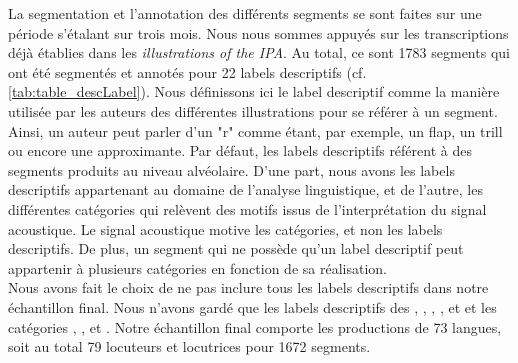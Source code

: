 La segmentation et l'annotation des différents segments se sont faites sur une période s'étalant sur trois mois. Nous nous sommes appuyés sur les transcriptions déjà établies dans les \textit{illustrations of the IPA}.
Au total, ce sont 1783 segments qui ont été segmentés et annotés pour 22 labels descriptifs (cf. \autoref{tab:table_descLabel}). Nous définissons ici le label descriptif comme la manière utilisée par les auteurs des différentes illustrations pour se référer à un segment.
Ainsi, un auteur peut parler d'un "r" comme étant, par exemple, un flap, un trill ou encore une approximante. Par défaut, les labels descriptifs référent à des segments produits au niveau alvéolaire. D'une part, nous avons les labels descriptifs appartenant au domaine de l'analyse linguistique, et de l'autre, les différentes catégories qui relèvent des motifs issus de l'interprétation du signal acoustique. Le signal acoustique motive les catégories, et non les labels descriptifs.
De plus, un segment qui ne possède qu'un label descriptif peut appartenir à plusieurs catégories en fonction de sa réalisation.\\

Nous avons fait le choix de ne pas inclure tous les labels descriptifs dans notre échantillon final. Nous n'avons gardé que les labels descriptifs des , , , ,  et  et les catégories , ,  et .
Notre échantillon final comporte les productions de 73 langues, soit au total 79 locuteurs et locutrices pour 1672 segments.\\


